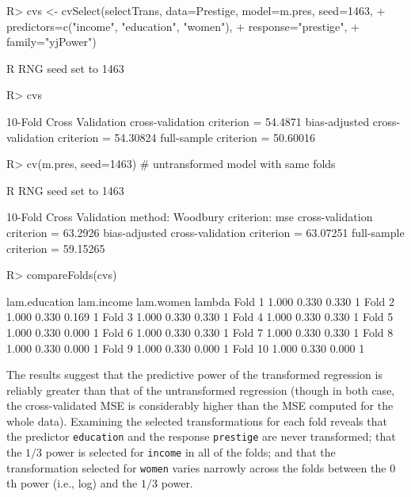 \documentclass[
]{jss}
\begin{document}
\begin{CodeChunk}
\begin{CodeInput}
R> cvs <- cvSelect(selectTrans, data=Prestige, model=m.pres, seed=1463,
+                 predictors=c("income", "education", "women"),
+                 response="prestige",
+                 family="yjPower")
\end{CodeInput}
\begin{CodeOutput}
R RNG seed set to 1463
\end{CodeOutput}
\begin{CodeInput}
R> cvs
\end{CodeInput}
\begin{CodeOutput}
10-Fold Cross Validation
cross-validation criterion = 54.4871
bias-adjusted cross-validation criterion = 54.30824
full-sample criterion = 50.60016 
\end{CodeOutput}
\begin{CodeInput}
R> cv(m.pres, seed=1463) # untransformed model with same folds
\end{CodeInput}
\begin{CodeOutput}
R RNG seed set to 1463
\end{CodeOutput}
\begin{CodeOutput}
10-Fold Cross Validation
method: Woodbury
criterion: mse
cross-validation criterion = 63.2926
bias-adjusted cross-validation criterion = 63.07251
full-sample criterion = 59.15265 
\end{CodeOutput}
\begin{CodeInput}
R> compareFolds(cvs)
\end{CodeInput}
\begin{CodeOutput}
        lam.education lam.income lam.women lambda
Fold 1          1.000      0.330     0.330      1
Fold 2          1.000      0.330     0.169      1
Fold 3          1.000      0.330     0.330      1
Fold 4          1.000      0.330     0.330      1
Fold 5          1.000      0.330     0.000      1
Fold 6          1.000      0.330     0.330      1
Fold 7          1.000      0.330     0.330      1
Fold 8          1.000      0.330     0.000      1
Fold 9          1.000      0.330     0.000      1
Fold 10         1.000      0.330     0.000      1
\end{CodeOutput}
\end{CodeChunk}

The results suggest that the predictive power of the transformed
regression is reliably greater than that of the untransformed regression
(though in both case, the cross-validated MSE is considerably higher
than the MSE computed for the whole data). Examining the selected
transformations for each fold reveals that the predictor
\texttt{education} and the response \texttt{prestige} are never
transformed; that the \(1/3\) power is selected for \texttt{income} in
all of the folds; and that the transformation selected for
\texttt{women} varies narrowly across the folds between the \(0\)th
power (i.e., log) and the \(1/3\) power.
\end{document}
